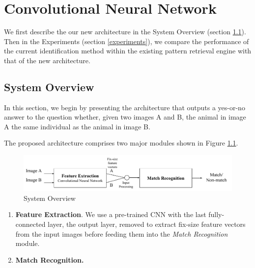 \graphicspath{{./images/chap7/}}
\chapter{Convolutional Neural Network}

We first describe the our new architecture in the System Overview (section
\ref{system}). Then in the Experiments (section \ref{experiments}), we compare
the performance of the current identification method within the existing
pattern retrieval engine with that of the new architecture.

\section{System Overview}\label{system}

In this section, we begin by presenting the architecture that outputs a
yes-or-no answer to the question whether, given two images A and B, the animal
in image A the same individual as the animal in image B.

The proposed architecture comprises two major modules shown in Figure
\ref{fig:cnn_overview}.

\begin{figure}[ht]
  \centering
  \includegraphics[width=\textwidth]{system/overview}
  \caption{System Overview}
  \label{fig:cnn_overview} %
\end{figure}

\begin{enumerate}
  \item \textbf{Feature Extraction}. We use a pre-trained CNN with the last
  fully-connected layer, the output layer, removed to extract fix-size feature
  vectors from the input images before feeding them into the \emph{Match Recognition} module.
  \item \textbf{Match Recognition.}
\end{enumerate}

